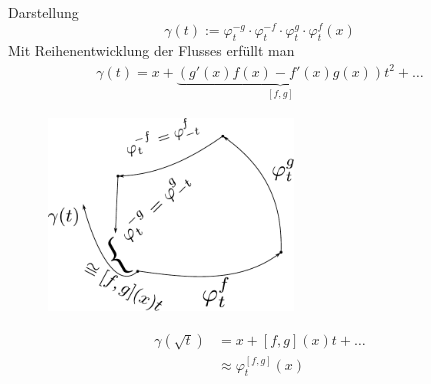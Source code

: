 \documentclass[ngerman]{tudscrreprt}
\begin{document}
Darstellung 
\begin{equation*}\gamma(t) := \varphi_t^{-g} \cdot \varphi_t^{-f} \cdot \varphi_t^g \cdot \varphi_t^f(x) \end{equation*} 
Mit Reihenentwicklung der Flusses erfüllt man 
\begin{align*}
\gamma(t) = x + \underbrace{(g'(x)f(x) - f'(x)g(x) )}_{[f,g]}t^2 + \dots
\end{align*}
\begin{figure}[H]
\centering
\def\svgwidth{200pt} 
  \includegraphics[width=6.5cm]{image332.pdf}
\end{figure}
\begin{align*}
\gamma(\sqrt{t}) &= x + [f,g](x)t + \dots\\ 
& \approx \varphi_t^{[f,g]} (x) 
\end{align*}
\end{document}
